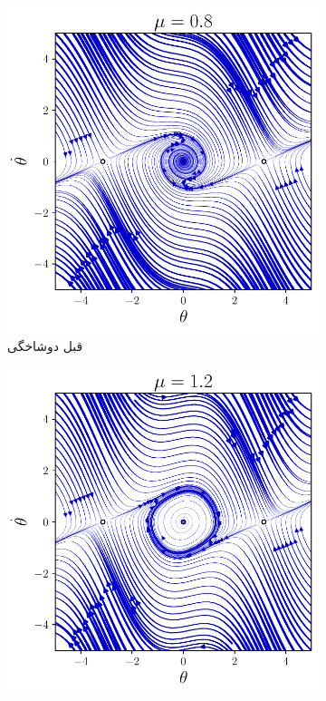 \documentclass[12pt,a4paper]{article}
\begin{document}
	\begin{figure}[h!]
		\centering
		\begin{subfigure}{0.49\linewidth}
			\centering
			\includegraphics[width=\linewidth]{fig/8.4.4.mu0.8}
			\caption{قبل دوشاخگی}
		\end{subfigure}
		\begin{subfigure}{0.49\linewidth}
			\centering
			\includegraphics[width=\linewidth]{fig/8.4.4.mu1.2}

\end{subfigure}
\end{figure}
\end{document}
